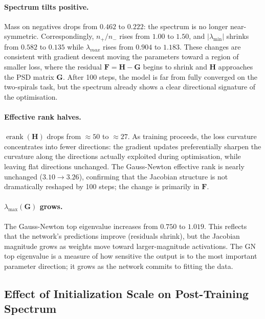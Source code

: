 \documentclass[12pt,a4paper]{article}
\newcommand{\erank}{\operatorname{erank}}
\newcommand{\bH}{\mathbf{H}}
\newcommand{\bG}{\mathbf{G}}
\newcommand{\bF}{\mathbf{F}}
\begin{document}
\paragraph{Spectrum tilts positive.}
Mass on negatives drops from $0.462$ to $0.222$: the spectrum is no longer near-symmetric. Correspondingly, $n_+/n_-$ rises from $1.00$ to $1.50$, and $|\lambda_{\min}|$ shrinks from $0.582$ to $0.135$ while $\lambda_{max}$ rises from $0.904$ to $1.183$. These changes are consistent with gradient descent moving the parameters toward a region of smaller loss, where the residual $\bF = \bH - \bG$ begins to shrink and $\bH$ approaches the PSD matrix $\bG$. After 100 steps, the model is far from fully converged on the two-spirals task, but the spectrum already shows a clear directional signature of the optimisation.

\paragraph{Effective rank halves.}
$\erank(\bH)$ drops from $\approx 50$ to $\approx 27$. As training proceeds, the loss curvature concentrates into fewer directions: the gradient updates preferentially sharpen the curvature along the directions actually exploited during optimisation, while leaving flat directions unchanged. The Gauss-Newton effective rank is nearly unchanged ($3.10 \to 3.26$), confirming that the Jacobian structure is not dramatically reshaped by 100 steps; the change is primarily in $\bF$.

\paragraph{$\lambda_{\max}(\bG)$ grows.}
The Gauss-Newton top eigenvalue increases from $0.750$ to $1.019$. This reflects that the network's predictions improve (residuals shrink), but the Jacobian magnitude grows as weights move toward larger-magnitude activations. The GN top eigenvalue is a measure of how sensitive the output is to the most important parameter direction; it grows as the network commits to fitting the data.

\subsection{Effect of Initialization Scale on Post-Training Spectrum}
\label{ssec:step100_sigma}
\end{document}
